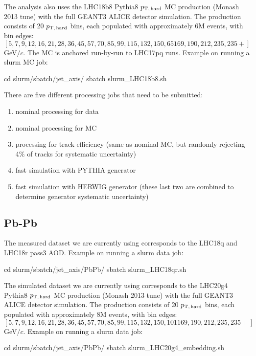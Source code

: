 \documentclass[12pt]{article}
\newcommand{\pThard}{$p_{\rm T, \, hard}$}
\newcommand{\GeVc}{GeV$/c$}
\begin{document}
The analysis also uses the LHC18b8 Pythia8 \pThard{} MC production (Monash 2013 tune) with the full
GEANT3 ALICE detector simulation. The production consists of 20 \pThard{} bins, each populated with
approximately 6M events, with bin edges: $[5, 7, 9, 12, 16, 21, 28, 36, 45, 57, 70, 85, 99, 115, 132, 150,
65 169, 190, 212, 235, 235+]$ \GeVc. The MC is anchored run-by-run to LHC17pq runs.
Example on running a slurm MC job:
\begin{tcolorbox}
\begin{verbnobox}[\scriptsize]
cd slurm/sbatch/jet_axis/
sbatch slurm_LHC18b8.sh
\end{verbnobox}  
\end{tcolorbox}

There are five different processing jobs that need to be submitted:
\begin{enumerate}
\item nominal processing for data
\item nominal processing for MC
\item processing for track efficiency (same as nominal MC, but randomly rejecting 4$\%$ of tracks for systematic uncertainty)
\item fast simulation with PYTHIA generator
\item fast simulation with HERWIG generator (these last two are combined to determine generator systematic uncertainty)
\end{enumerate}

\subsection{Pb-Pb}

The measured dataset we are currently using corresponds to the LHC18q and LHC18r pass3 AOD.
Example on running a slurm data job:
\begin{tcolorbox}
\begin{verbnobox}[\scriptsize]
cd slurm/sbatch/jet_axis/PbPb/
sbatch slurm_LHC18qr.sh
\end{verbnobox}  
\end{tcolorbox}

The simulated dataset we are currently using corresponds to the LHC20g4 Pythia8 \pThard{} MC production (Monash 2013 tune) with the full
GEANT3 ALICE detector simulation. The production consists of 20 \pThard{} bins, each populated with
approximately 8M events, with bin edges: $[5, 7, 9, 12, 16, 21, 28, 36, 45, 57, 70, 85, 99, 115, 132, 150, 101 169, 190, 212, 235, 235+]$ \GeVc. 
Example on running a slurm data job:
\begin{tcolorbox}
\begin{verbnobox}[\scriptsize]
cd slurm/sbatch/jet_axis/PbPb/
sbatch slurm_LHC20g4_embedding.sh
\end{verbnobox}  
\end{tcolorbox}
\end{document}
